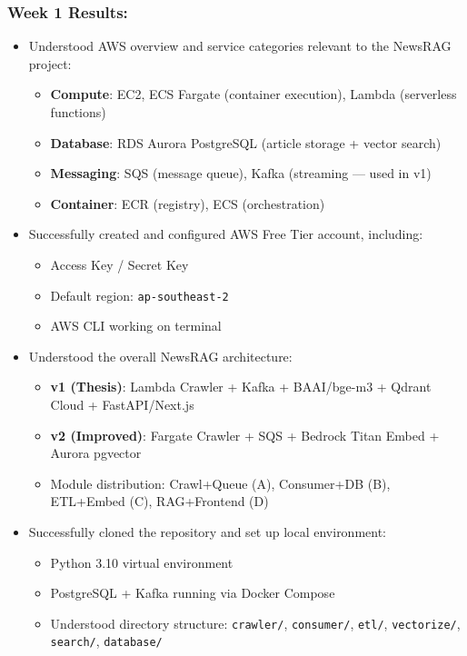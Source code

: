 \hypertarget{week-1-results}{%
\subsubsection{Week 1 Results:}}

\begin{itemize}
\tightlist
\item
  Understood AWS overview and service categories relevant to the NewsRAG
  project:

  \begin{itemize}
  \tightlist
  \item
    \textbf{Compute}: EC2, ECS Fargate (container execution), Lambda
    (serverless functions)
  \item
    \textbf{Database}: RDS Aurora PostgreSQL (article storage + vector
    search)
  \item
    \textbf{Messaging}: SQS (message queue), Kafka (streaming --- used
    in v1)
  \item
    \textbf{Container}: ECR (registry), ECS (orchestration)
  \end{itemize}
\item
  Successfully created and configured AWS Free Tier account, including:

  \begin{itemize}
  \tightlist
  \item
    Access Key / Secret Key
  \item
    Default region: \texttt{ap-southeast-2}
  \item
    AWS CLI working on terminal
  \end{itemize}
\item
  Understood the overall NewsRAG architecture:

  \begin{itemize}
  \tightlist
  \item
    \textbf{v1 (Thesis)}: Lambda Crawler + Kafka + BAAI/bge-m3 + Qdrant
    Cloud + FastAPI/Next.js
  \item
    \textbf{v2 (Improved)}: Fargate Crawler + SQS + Bedrock Titan Embed
    + Aurora pgvector
  \item
    Module distribution: Crawl+Queue (A), Consumer+DB (B), ETL+Embed
    (C), RAG+Frontend (D)
  \end{itemize}
\item
  Successfully cloned the repository and set up local environment:

  \begin{itemize}
  \tightlist
  \item
    Python 3.10 virtual environment
  \item
    PostgreSQL + Kafka running via Docker Compose
  \item
    Understood directory structure: \texttt{crawler/},
    \texttt{consumer/}, \texttt{etl/}, \texttt{vectorize/},
    \texttt{search/}, \texttt{database/}
  \end{itemize}
\end{itemize}
